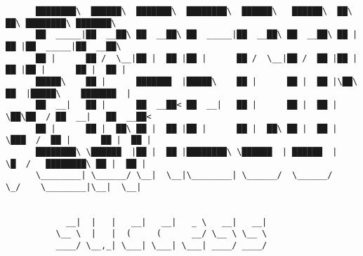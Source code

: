 \documentclass[varwidth=\maxdimen,margin=0.5cm,multi={verbatim}]{standalone}
\begin{document}
\begin{verbatim}
      ████████\  ██████\  ███████\  ████████\  ██████\   ██████\  ██\    ██\ ████████\ ███████\
      ██  _____|██  __██\ ██  __██\ ██  _____|██  __██\ ██  __██\ ██ |   ██ |██  _____|██  __██\
      ██ |      ██ /  \__|██ |  ██ |██ |      ██ /  \__|██ /  ██ |██ |   ██ |██ |      ██ |  ██ |
      █████\    ██ |      ███████  |█████\    ██ |      ██ |  ██ |\██\  ██  |█████\    ███████  |
      ██  __|   ██ |      ██  __██< ██  __|   ██ |      ██ |  ██ | \██\██  / ██  __|   ██  __██<
      ██ |      ██ |  ██\ ██ |  ██ |██ |      ██ |  ██\ ██ |  ██ |  \███  /  ██ |      ██ |  ██ |
      ████████\ \██████  |██ |  ██ |████████\ \██████  | ██████  |   \█  /   ████████\ ██ |  ██ |
      \________| \______/ \__|  \__|\________| \______/  \______/     \_/    \________|\__|  \__|


            __|  |   |   __|   __|   _ \   __|   __|
          \__ \  |   |  (     (      __/ \__ \ \__ \
          ____/ \__,_| \___| \___| \___| ____/ ____/




\end{verbatim}
\end{document}
